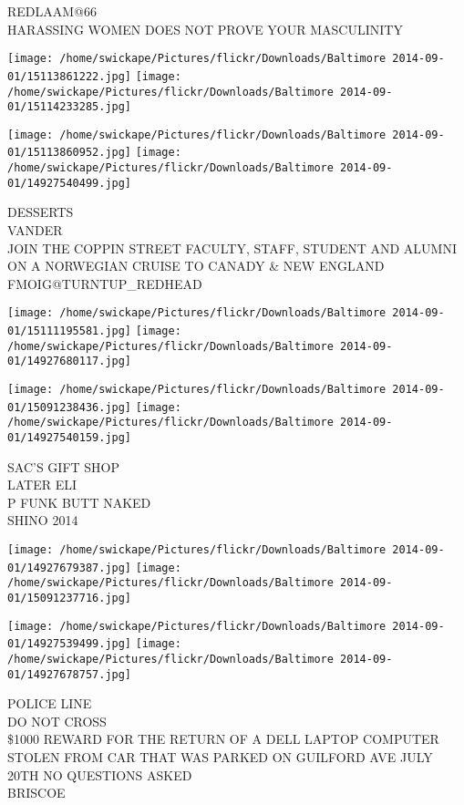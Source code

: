 \documentclass[10pt,letterpaper]{article}
\begin{document}
REDLAAM@66\\
HARASSING WOMEN DOES NOT PROVE YOUR MASCULINITY
\pagebreak

\texttt{[image: /home/swickape/Pictures/flickr/Downloads/Baltimore 2014-09-01/15113861222.jpg]}
\texttt{[image: /home/swickape/Pictures/flickr/Downloads/Baltimore 2014-09-01/15114233285.jpg]}

\texttt{[image: /home/swickape/Pictures/flickr/Downloads/Baltimore 2014-09-01/15113860952.jpg]}
\texttt{[image: /home/swickape/Pictures/flickr/Downloads/Baltimore 2014-09-01/14927540499.jpg]}

DESSERTS\\
VANDER\\
JOIN THE COPPIN STREET FACULTY, STAFF, STUDENT AND ALUMNI ON A NORWEGIAN CRUISE TO CANADY \& NEW ENGLAND\\
FMOIG@TURNTUP\_REDHEAD
\pagebreak

\texttt{[image: /home/swickape/Pictures/flickr/Downloads/Baltimore 2014-09-01/15111195581.jpg]}
\texttt{[image: /home/swickape/Pictures/flickr/Downloads/Baltimore 2014-09-01/14927680117.jpg]}

\texttt{[image: /home/swickape/Pictures/flickr/Downloads/Baltimore 2014-09-01/15091238436.jpg]}
\texttt{[image: /home/swickape/Pictures/flickr/Downloads/Baltimore 2014-09-01/14927540159.jpg]}

SAC'S GIFT SHOP\\
LATER ELI\\
P FUNK BUTT NAKED\\
SHINO 2014
\pagebreak

\texttt{[image: /home/swickape/Pictures/flickr/Downloads/Baltimore 2014-09-01/14927679387.jpg]}
\texttt{[image: /home/swickape/Pictures/flickr/Downloads/Baltimore 2014-09-01/15091237716.jpg]}

\texttt{[image: /home/swickape/Pictures/flickr/Downloads/Baltimore 2014-09-01/14927539499.jpg]}
\texttt{[image: /home/swickape/Pictures/flickr/Downloads/Baltimore 2014-09-01/14927678757.jpg]}

POLICE LINE\\
DO NOT CROSS\\
\$1000 REWARD FOR THE RETURN OF A DELL LAPTOP COMPUTER STOLEN FROM CAR THAT WAS PARKED ON GUILFORD AVE JULY 20TH NO QUESTIONS ASKED\\
BRISCOE
\pagebreak
\end{document}
